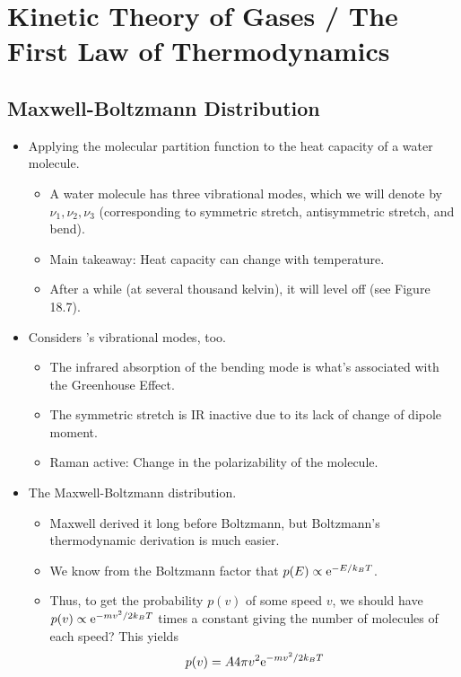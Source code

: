 \documentclass[../notes.tex]{subfiles}
\begin{document}
\chapter{Kinetic Theory of Gases / The First Law of Thermodynamics}
\section{Maxwell-Boltzmann Distribution}
\begin{itemize}
    \item {}Applying the molecular partition function to the heat capacity of a water molecule.
    \begin{itemize}
        \item A water molecule has three vibrational modes, which we will denote by $\nu_1,\nu_2,\nu_3$ (corresponding to symmetric stretch, antisymmetric stretch, and bend).
        \item Main takeaway: Heat capacity can change with temperature.
        \item After a while (at several thousand kelvin), it will level off (see Figure 18.7).
    \end{itemize}
    \item Considers 's vibrational modes, too.
    \begin{itemize}
        \item The infrared absorption of the bending mode is what's associated with the Greenhouse Effect.
        \item The symmetric stretch is IR inactive due to its lack of change of dipole moment.
        \item Raman active: Change in the polarizability of the molecule.
    \end{itemize}
    \item The Maxwell-Boltzmann distribution.
    \begin{itemize}
        \item Maxwell derived it long before Boltzmann, but Boltzmann's thermodynamic derivation is much easier.
        \item We know from the Boltzmann factor that $p(E)\propto\e[-E/k_BT]$.
        \item Thus, to get the probability $p(v)$ of some speed $v$, we should have $p(v)\propto\e[-mv^2/2k_BT]$ times a constant giving the number of molecules of each speed? This yields
        \begin{equation*}
            p(v) = A4\pi v^2\e[-mv^2/2k_BT]
        \end{equation*}

\end{itemize}
\end{itemize}
\end{document}
